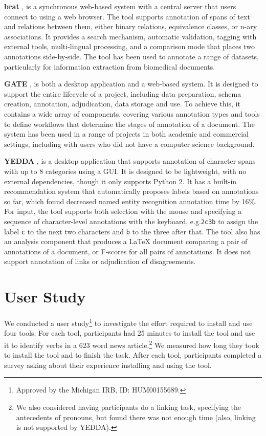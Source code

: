 \documentclass[11pt,a4paper]{article}
\makeatletter
\newcommand{\myeg}{e.g.\@\xspace}
\newcommand{\tightparagraph}[1]{\noindent\textbf{#1}}
\makeatother
\begin{document}
\tightparagraph{brat} \citep{brat}, is a synchronous web-based system with a central server that users connect to using a web browser.
The tool supports annotation of spans of text and relations between them, either binary relations, equivalence classes, or n-ary associations.
It provides a search mechanism, automatic validation, tagging with external tools, multi-lingual processing, and a comparison mode that places two annotations side-by-side.
The tool has been used to annotate a range of datasets, particularly for information extraction from biomedical documents.

\tightparagraph{GATE} \citep{gate}, is both a desktop application and a web-based system.
It is designed to support the entire lifecycle of a project, including data preparation, schema creation, annotation, adjudication, data storage and use.
To achieve this, it contains a wide array of components, covering various annotation types and tools to define workflows that determine the stages of annotation of a document.
The system has been used in a range of projects in both academic and commercial settings, including with users who did not have a computer science background.

\tightparagraph{YEDDA} \citep{yedda}, is a desktop application that supports annotation of character spans with up to 8 categories using a GUI.
It is designed to be lightweight, with no external dependencies, though it only supports Python 2.
It has a built-in recommendation system that automatically proposes labels based on annotations so far, which \citet{yedda} found decreased named entity recognition annotation time by 16\%.
For input, the tool supports both selection with the mouse and specifying a sequence of character-level annotations with the keyboard, \myeg \texttt{2c3b} to assign the label \texttt{c} to the next two characters and \texttt{b} to the three after that.
The tool also has an analysis component that produces a LaTeX document comparing a pair of annotations of a document, or F-scores for all pairs of annotations.
It does not support annotation of links or adjudication of disagreements.

\section{User Study}

We conducted a user study\footnote{
  Approved by the Michigan IRB, ID: HUM00155689.
} to investigate the effort required to install and use four tools.
For each tool, participants had 25 minutes to install the tool and use it to identify verbs in a 623 word news article.\footnote{
  We also considered having participants do a linking task, specifying the antecedents of pronouns, but found there was not enough time (also, linking is not supported by YEDDA).
}
We measured how long they took to install the tool and to finish the task.
After each tool, participants completed a survey asking about their experience installing and using the tool.
\end{document}
